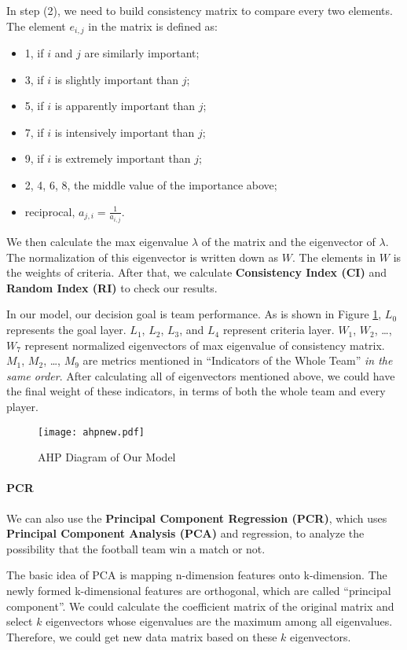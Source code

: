 \documentclass[12pt]{mcmthesis}
\begin{document}
	In step (2), we need to build consistency matrix to compare every two elements. The element $e_{i, j}$ in the matrix is defined as:
	\begin{itemize}
		\item 1, if $i$ and $j$ are similarly important;
		\item 3, if $i$ is slightly important than $j$;
		\item 5, if $i$ is apparently important than $j$;
		\item 7, if $i$ is intensively important than $j$;
		\item 9, if $i$ is extremely important than $j$;
		\item 2, 4, 6, 8, the middle value of the importance above;
		\item reciprocal, $a_{j, i}= \frac{1}{a_{i, j}}$.
	\end{itemize}
	
	We then calculate the max eigenvalue $\lambda$ of the matrix and the eigenvector of $\lambda$. The normalization of this eigenvector is written down as $W$. The elements in $W$ is the weights of criteria. After that, we calculate \textbf{Consistency Index (CI)} and \textbf{Random Index (RI)} to check our results.~\cite{analytic}
	
	In our model, our decision goal is team performance. As is shown in Figure \ref{fig:ahp}, $L_0$ represents the goal layer. $L_1$, $L_2$, $L_3$, and $L_4$ represent criteria layer. $W_1$, $W_2$, \ldots, $W_7$ represent normalized eigenvectors of max eigenvalue of consistency matrix. $M_1$, $M_2$, \ldots, $M_9$ are metrics mentioned in ``Indicators of the Whole Team'' \textit{in the same order}. After calculating all of eigenvectors mentioned above, we could have the final weight of these indicators, in terms of both the whole team and every player.
	\begin{figure}[h]
		\centering
		\texttt{[image: ahpnew.pdf]}
		\caption{AHP Diagram of Our Model}\label{fig:ahp}
	\end{figure}
	
	\paragraph{PCR}
	We can also use the \textbf{Principal Component Regression (PCR)}, which uses \textbf{Principal Component Analysis (PCA)} and regression, to analyze the possibility that the football team win a match or not.
	
	The basic idea of PCA is mapping n-dimension features onto k-dimension. The newly formed k-dimensional features are orthogonal, which are called ``principal component''. We could calculate the coefficient matrix of the original matrix and select $k$ eigenvectors whose eigenvalues are the maximum among all eigenvalues. Therefore, we could get new data matrix based on these $k$ eigenvectors.~\cite{principal}
	
\end{document}
